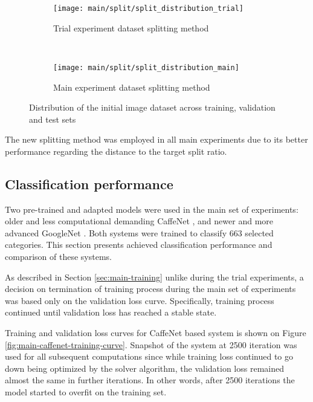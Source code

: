     \begin{figure}[H]
    \centering
    \begin{subfigure}[a]{0.9\textwidth}
        \texttt{[image: main/split/split\_distribution\_trial]}
        \caption{Trial experiment dataset splitting method}
        \label{fig:main-split-distribution-trial}
    \end{subfigure}
    \\
    \begin{subfigure}[a]{0.9\textwidth}
        \texttt{[image: main/split/split\_distribution\_main]}
        \caption{Main experiment dataset splitting method}
        \label{fig:main-split-distribution-main}
    \end{subfigure}
    \caption{Distribution of the initial image dataset across training, validation and test sets}
    \label{fig:main-split-distribution}
    \end{figure}
    
    The new splitting method was employed in all main experiments due to its better performance regarding the distance to the target split ratio.
    
\subsection{Classification performance}
    Two pre-trained and adapted models were used in the main set of experiments: older and less computational demanding CaffeNet \cite{CaffeNet}, and newer and more advanced GoogleNet \cite{Szegedy2015GoingDeeper}. Both systems were trained to classify 663 selected categories. This section presents achieved classification performance and comparison of these systems.
    
    As described in Section \ref{sec:main-training} unlike during the trial experiments, a decision on termination of training process during the main set of experiments was based only on the validation loss curve. Specifically, training process continued until validation loss has reached a stable state.
    
    Training and validation loss curves for CaffeNet based system is shown on Figure \ref{fig:main-caffenet-training-curve}. Snapshot of the system at 2500 iteration was used for all subsequent computations since while training loss continued to go down being optimized by the solver algorithm, the validation loss remained almost the same in further iterations. In other words, after 2500 iterations the model started to overfit on the training set.
    
